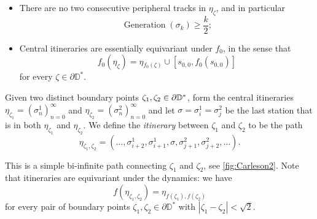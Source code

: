 \begin{itemize}
	\item There are no two consecutive peripheral tracks in $\eta_{\zeta}$, and in particular
	\begin{equation}
	\label{generation-lower-bound}
		\operatorname{Generation}(\sigma_k)\geq \frac k2;
	\end{equation}
	
	\item Central itineraries are essentially equivariant under $f_{0}$, in the sense that
	\begin{equation*}
		f_{0}(\eta_{\zeta})=\eta{}_{f_{0}(\zeta)}\cup[s_{0,0},f_0(s_{0,0})]
	\end{equation*}
	for every $\zeta\in \partial \mathbb D^*$.
\end{itemize}

\begin{definition}
\label{def-disk-itinerary}
Given two distinct boundary points $\zeta_{1},\zeta_{2}\in\partial\mathbb{D}^*$, form the central itineraries $\eta_{\zeta_{1}}=\left(\sigma_{n}^{1}\right)_{n=0}^{\infty}$ and $\eta_{\zeta_{2}}=\left(\sigma_{n}^{2}\right)_{n=0}^{\infty}$ and let  $\sigma=\sigma^1_i=\sigma^2_j$ be the last station that is in both $\eta_{\zeta_{1}}$ and $\eta_{\zeta_{2}}$.  
	 We define the \emph{itinerary} between  $\zeta_{1}$ and $\zeta_{2}$ to be the path 
$$
 \eta_{\zeta_{1},\zeta_{2}}=  \left(\dots,\sigma_{i+2}^{1},\sigma_{i+1}^{1},\sigma,\sigma_{j+1}^{2},\sigma_{j+2}^{2},\dots\right).
$$

	This is a simple bi-infinite path connecting $\zeta_{1}$ and $\zeta_{2}$, see \cref{fig:Carleson2}. Note that itineraries are equivariant under the dynamics: we have  \begin{equation}
		f(\eta_{\zeta_1,\zeta_2})=\eta_{f(\zeta_1),f(\zeta_2)}
	\end{equation} for every pair of boundary points $\zeta_1,\zeta_2 \in \partial \mathbb D^*$ with $|\zeta_1-\zeta_2| < \sqrt{2}$.
\end{definition}



